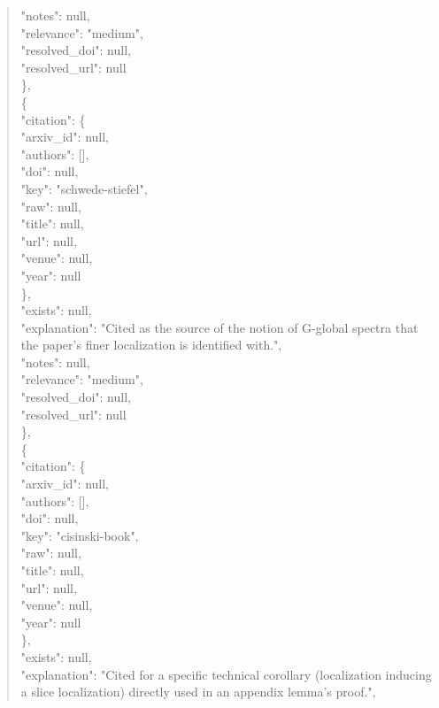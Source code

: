 \documentclass[11pt]{article}
\begin{document}
\begin{quote}
      "notes": null,\\
      "relevance": "medium",\\
      "resolved\_doi": null,\\
      "resolved\_url": null\\
    \},\\
    \{\\
      "citation": \{\\
        "arxiv\_id": null,\\
        "authors": [],\\
        "doi": null,\\
        "key": "schwede-stiefel",\\
        "raw": null,\\
        "title": null,\\
        "url": null,\\
        "venue": null,\\
        "year": null\\
      \},\\
      "exists": null,\\
      "explanation": "Cited as the source of the notion of G-global spectra that the paper's finer localization is identified with.",\\
      "notes": null,\\
      "relevance": "medium",\\
      "resolved\_doi": null,\\
      "resolved\_url": null\\
    \},\\
    \{\\
      "citation": \{\\
        "arxiv\_id": null,\\
        "authors": [],\\
        "doi": null,\\
        "key": "cisinski-book",\\
        "raw": null,\\
        "title": null,\\
        "url": null,\\
        "venue": null,\\
        "year": null\\
      \},\\
      "exists": null,\\
      "explanation": "Cited for a specific technical corollary (localization inducing a slice localization) directly used in an appendix lemma's proof.",\\

\end{quote}
\end{document}

